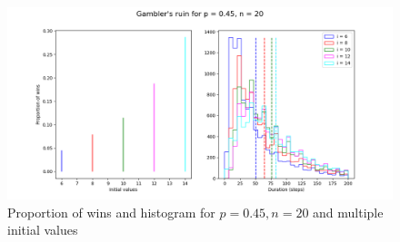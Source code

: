 \begin{figure}
\begin{center}
\includegraphics[width=\textwidth]{gamblers-ruin-02}
\caption{Proportion of wins and histogram for $p=0.45, n=20$ and multiple initial values}\label{f.gambler-hist2}
\end{center}
\end{figure}
